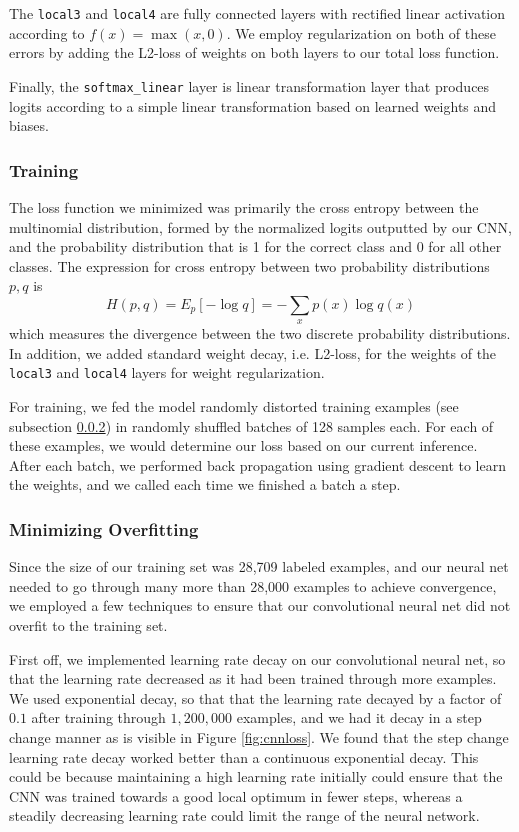 \documentclass[11pt, twocolumn, twoside]{article}
\begin{document}
The \texttt{local3} and \texttt{local4} are fully connected layers with rectified linear activation according to $f(x) = \max(x, 0)$. We employ regularization on both of these errors by adding the L2-loss of weights on both layers to our total loss function. 

Finally, the \texttt{softmax\_linear} layer is linear transformation layer that produces logits according to a simple linear transformation based on learned weights and biases.

\subsubsection{Training}

The loss function we minimized was primarily the cross entropy between the multinomial distribution, formed by the normalized logits outputted by our CNN, and the probability distribution that is 1 for the correct class and 0 for all other classes. The expression for cross entropy between two probability distributions $p, q$ is
\[H(p, q) = E_p[-\log q] = -\sum_x p(x)\log q(x)\]
which measures the divergence between the two discrete probability distributions. In addition, we added standard weight decay, i.e. L2-loss, for the weights of the \texttt{local3} and \texttt{local4} layers for weight regularization.

For training, we fed the model randomly distorted training examples (see subsection \ref{overfitting}) in randomly shuffled batches of 128 samples each. For each of these examples, we would determine our loss based on our current inference. After each batch, we performed back propagation using gradient descent to learn the weights, and we called each time we finished a batch a step.


\subsubsection{Minimizing Overfitting} \label{overfitting}

Since the size of our training set was 28,709 labeled examples, and our neural net needed to go through many more than 28,000 examples to achieve convergence, we employed a few techniques to ensure that our convolutional neural net did not overfit to the training set.

First off, we implemented learning rate decay on our convolutional neural net, so that the learning rate decreased as it had been trained through more examples. We used exponential decay, so that that the learning rate decayed by a factor of $0.1$ after training through $1,200,000$ examples, and we had it decay in a step change manner as is visible in Figure \ref{fig:cnnloss}. We found that the step change learning rate decay worked better than a continuous exponential decay. This could be because maintaining a high learning rate initially could ensure that the CNN was trained towards a good local optimum in fewer steps, whereas a steadily decreasing learning rate could limit the range of the neural network.
\end{document}

